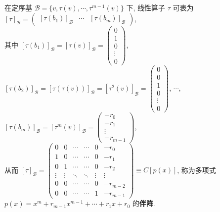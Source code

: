 \documentclass{note}
\begin{document}
\begin{df}[伴阵]
    在定序基 $\mathcal{B}=\{v,\tau(v),\cdots,\tau^{m-1}(v)\}$ 下, 线性算子 $\tau$ 可表为 $[\tau]_{\mathcal{B}}=\begin{pmatrix}
            [\tau(b_1)]_{\mathcal{B}}&\cdots&[\tau(b_m)]_{\mathcal{B}}
    \end{pmatrix}$,\\
    其中 $[\tau(b_1)]_{\mathcal{B}}=[\tau(v)]_{\mathcal{B}}=\begin{pmatrix}
        0\\
        1\\
        0\\
        \vdots\\
        0
    \end{pmatrix}$, $[\tau(b_2)]_{\mathcal{B}}=[\tau(\tau(v))]_{\mathcal{B}}=[\tau^2(v)]_{\mathcal{B}}=\begin{pmatrix}
        0\\
        0\\
        1\\
        0\\
        \vdots\\
        0
    \end{pmatrix}$, $\cdots$, $[\tau(b_m)]_{\mathcal{B}}=[\tau^m(v)]_{\mathcal{B}}=\begin{pmatrix}
        -r_0\\
        -r_1\\
        \vdots\\
        -r_{m-1}
    \end{pmatrix}$,\\
    从而 $[\tau]_{\mathcal{B}}=\begin{pmatrix}
        0&0&\cdots&\cdots&0&-r_0\\
        1&0&\cdots&\cdots&0&-r_1\\
        0&1&\cdots&\cdots&0&-r_2\\
        \vdots&\vdots&\ddots&\ddots&\vdots&\vdots\\
        0&0&\cdots&\cdots&0&-r_{m-2}\\
        0&0&\cdots&\cdots&1&-r_{m-1}
    \end{pmatrix}\equiv C[p(x)]$, 称为多项式 $p(x)=x^m+r_{m-1}x^{m-1}+\cdots+r_1x+r_0$ 的\textbf{伴阵}.
\end{df}
\end{document}
